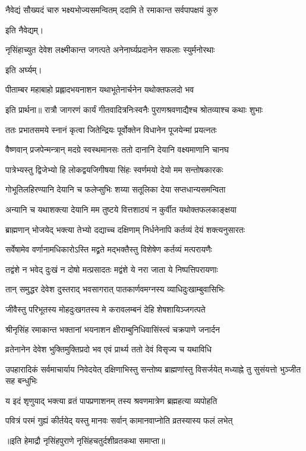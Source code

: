 \twolineshloka
{नैवेद्यं सौख्यदं चारु भक्ष्यभोज्यसमन्वितम्}
{ददामि ते रमाकान्त सर्वपापक्षयं कुरु} %

इति नैवेद्यम्।

\twolineshloka
{नृसिंहाच्युत देवेश लक्ष्मीकान्त जगत्पते}
{अनेनार्घ्यप्रदानेन सफलाः स्युर्मनोरथाः} %

इति अर्घ्यम्।

\twolineshloka
{पीताम्बर महाबाहो प्रह्लादभयनाशन}
{यथाभूतेनार्चनेन यथोक्तफलदो भव} %

इति प्रार्थना॥
\twolineshloka
{रात्रौ जागरणं कार्यं गीतवादित्रनिःस्वनैः}
{पुराणश्रवणाद्यैश्च श्रोतव्याश्च कथाः शुभाः} %

\twolineshloka
{ततः प्रभातसमये स्नानं कृत्वा जितेन्द्रियः}
{पूर्वोक्तेन विधानेन पूजयेन्मां प्रयत्नतः} %

\twolineshloka
{वैष्णवान् प्रजपेन्मन्त्रान् मदग्रे स्वस्थमानसः}
{ततो दानानि देयानि वक्ष्यमाणानि चानघ} %

\twolineshloka
{पात्रेभ्यस्तु द्विजेभ्यो हि लोकद्वयजिगीषया}
{सिंहः स्वर्णमयो देयो मम सन्तोषकारकः} %

\twolineshloka
{गोभूतिलहिरण्यानि देयानि च फलेप्सुभिः}
{शय्या सतूलिका देया सप्तधान्यसमन्विता} %

\twolineshloka
{अन्यानि च यथाशक्त्या देयानि मम तुष्टये}
{वित्तशाठ्यं न कुर्वीत यथोक्तफलकाङ्क्षया} %

\twolineshloka
{ब्राह्मणान् भोजयेद् भक्त्या तेभ्यो दद्याच्च दक्षिणाम्}
{निर्धनेनापि कर्तव्यं देयं शक्त्यनुसारतः} %


\twolineshloka
{सर्वेषामेव वर्णानामधिकारोऽस्ति मद्व्रते}
{मद्भक्तैस्तु विशेषेण कर्तव्यं मत्परायणैः} %


\twolineshloka
{तद्वंशे न भवेद् दुःखं न दोषो मत्प्रसादतः}
{मद्वंशे ये नरा जाता ये निष्पत्तिपरायणाः} %


\twolineshloka
{तान् समुद्धर देवेश दुस्तराद् भवसागरात्}
{पातकार्णवमग्नस्य व्याधिदुःखाम्बुवासिभिः} %


\twolineshloka
{जीवैस्तु परिभूतस्य मोहदुःखगतस्य मे}
{करावलम्बनं देहि शेषशायिञ्जगत्पते} %


\twolineshloka
{श्रीनृसिंह रमाकान्त भक्तानां भयनाशन}
{क्षीराम्बुनिधिवासिंस्त्वं चक्रपाणे जनार्दन} %


\twolineshloka
{व्रतेनानेन देवेश भुक्तिमुक्तिप्रदो भव}
{एवं प्रार्थ्य ततो देवं विसृज्य च यथाविधि} %

\threelineshloka
{उपहारादिकं सर्वमाचार्याय निवेदयेत्}
{दक्षिणाभिस्तु सन्तोष्य ब्राह्मणांस्तु विसर्जयेत्} %
{मध्याह्ने तु सुसंयत्तो भुञ्जीत सह बन्धुभिः}

\twolineshloka
{य इदं शृणुयाद् भक्त्या व्रतं पापप्रणाशनम्}
{तस्य श्रवणमात्रेण ब्रह्महत्या व्यपोहति} %

\twolineshloka
{पवित्रं परमं गुह्यं कीर्तयेद् यस्तु मानवः}
{सर्वान् कामानवाप्नोति व्रतस्यास्य फलं लभेत्}

॥इति हेमाद्रौ नृसिंहपुराणे नृसिंहचतुर्दशीव्रतकथा समाप्ता॥
